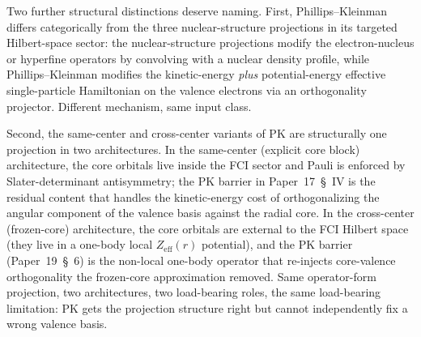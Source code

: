 \documentclass[11pt]{article}
\begin{document}
Two further structural distinctions deserve naming.  First,
Phillips--Kleinman differs categorically from the three
nuclear-structure projections in its targeted Hilbert-space sector:
the nuclear-structure projections modify the
electron-nucleus or hyperfine operators by convolving with a nuclear
density profile, while Phillips--Kleinman modifies the kinetic-energy
\emph{plus} potential-energy effective single-particle Hamiltonian
on the valence electrons via an orthogonality projector.  Different
mechanism, same input class.

Second, the same-center and cross-center variants of PK are
structurally one projection in two architectures.  In the same-center
(explicit core block) architecture, the core orbitals live inside the
FCI sector and Pauli is enforced by Slater-determinant antisymmetry;
the PK barrier in Paper~17~\S~IV is the residual content
that handles the kinetic-energy cost of orthogonalizing the angular
component of the valence basis against the radial core.  In the
cross-center (frozen-core) architecture, the core orbitals are
external to the FCI Hilbert space (they live in a one-body local
$Z_\text{eff}(r)$ potential), and the PK barrier (Paper~19~\S~6)
is the non-local one-body operator that
re-injects core-valence orthogonality the frozen-core approximation
removed.  Same operator-form projection, two architectures, two
load-bearing roles, the same load-bearing limitation: PK gets the
projection structure right but cannot independently fix a wrong
valence basis.
\end{document}
